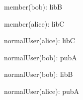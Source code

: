 \documentclass{article}
\begin{document}
{\begin{minipage}{\tableWidth}
\begin{description}[align=left,leftmargin=1em,noitemsep,labelsep=\parindent]
\item{{member(\allowbreak{}bob): libB}}
\item{{member(\allowbreak{}alice): libC}}
\item{{normalUser(\allowbreak{}alice): libC}}
\item{{normalUser(\allowbreak{}bob): pubA}}
\item{{normalUser(\allowbreak{}bob): libB}}
\item{{normalUser(\allowbreak{}alice): pubA}}
\end{description}\end{minipage}}
\end{document}
